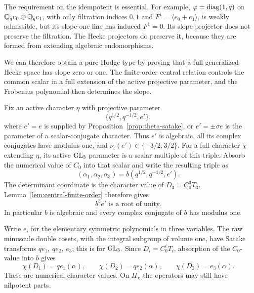 The requirement on the idempotent is essential. For example,
\(\varphi=\operatorname{diag}(1,q)\) on \(\mathbb{Q}_qe_0\oplus\mathbb{Q}_qe_1\), with only
filtration indices \(0,1\) and \(F^1=\langle e_0+e_1\rangle\), is
weakly admissible, but its slope-one line has induced \(F^1=0\).
Its slope projector does not preserve the filtration. The Hecke
projectors do preserve it, because they are formed from extending
algebraic endomorphisms.

We can therefore obtain a pure Hodge type by proving that a full
generalized Hecke space has slope zero or one. The finite-order central
relation controls the common scalar in a full extension of the active
projective parameter, and the Frobenius polynomial then determines the
slope.

Fix an active character \(\eta\) with projective parameter
\[
\{q^{1/2},q^{-1/2},e'\},
\]
where \(e'=e\) is supplied by Proposition~\ref{prop:theta-satake}, or
\(e'=\pm\sigma e\) is the parameter of a scalar-conjugate character.
Thus \(e'\) is algebraic, all its complex conjugates have modulus one,
and \(\nu_\iota(e')\in\{-3/2,3/2\}\). For a full character \(\chi\)
extending \(\eta\), its active \(\operatorname{GL}_3\) parameter is a scalar
multiple of this triple. Absorb the numerical value of \(C_0\) into
that scalar and write the resulting triple as
\begin{equation}\label{eq:full-satake-triple}
(\alpha_1,\alpha_2,\alpha_3)
=b(q^{1/2},q^{-1/2},e').
\end{equation}
The determinant coordinate is the character value of
\(D_3=C_0^3T_3\). Lemma~\ref{lem:central-finite-order} therefore gives
\begin{equation}\label{eq:satake-central-relation}
b^3e' \text{ is a root of unity}.
\end{equation}
In particular \(b\) is algebraic and every complex conjugate of \(b\)
has modulus one.

Write \(e_i\) for the elementary symmetric polynomials in three
variables. The raw minuscule double cosets, with the integral subgroup
of volume one, have Satake transforms
\(q e_1,\ q e_2,\ e_3\); this is
\cite[Equation~(3.14) and \S6]{Gross1998} for \(\operatorname{GL}_3\).
Since \(D_i=C_0^iT_i\), absorption of the \(C_0\)-value into \(b\)
gives
\begin{equation}\label{eq:raw-D-character}
\chi(D_1)=q e_1(\alpha),\qquad
\chi(D_2)=q e_2(\alpha),\qquad
\chi(D_3)=e_3(\alpha).
\end{equation}
These are numerical character values. On \(H_\chi\) the operators
may still have nilpotent parts.

